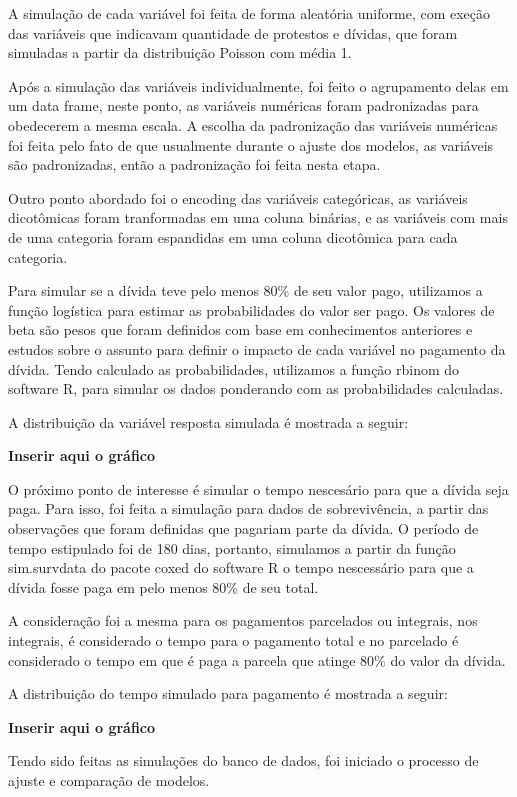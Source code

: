 \documentclass[12pt,a4paper]{article}
\begin{document}
A simulação de cada variável foi feita de forma aleatória uniforme, com exeção das variáveis que indicavam quantidade de protestos e dívidas, que foram simuladas a partir da distribuição Poisson com média 1.

Após a simulação das variáveis individualmente, foi feito o agrupamento delas em um data frame, neste ponto, as variáveis numéricas foram padronizadas para obedecerem a mesma escala. A escolha da padronização das variáveis numéricas foi feita pelo fato de que usualmente durante o ajuste dos modelos, as variáveis são padronizadas, então a padronização foi feita nesta etapa.

Outro ponto abordado foi o encoding das variáveis categóricas, as variáveis dicotômicas foram tranformadas em uma coluna binárias, e as variáveis com mais de uma categoria foram espandidas em uma coluna dicotômica para cada categoria.

Para simular se a dívida teve pelo menos 80\% de seu valor pago, utilizamos a função logística para estimar as probabilidades do valor ser pago. Os valores de beta são pesos que foram definidos com base em conhecimentos anteriores e estudos sobre o assunto para definir o impacto de cada variável no pagamento da dívida. Tendo calculado as probabilidades, utilizamos a função rbinom do software R, para simular os dados ponderando com as probabilidades calculadas.

A distribuição da variável resposta simulada é mostrada a seguir:



 \begin{center}
 \textbf{Inserir aqui o gráfico}
\end{center}


O próximo ponto de interesse é simular o tempo nescesário para que a dívida seja paga. Para isso, foi feita a simulação para dados de sobrevivência, a partir das observações que foram definidas que pagariam parte da dívida. O período de tempo estipulado foi de 180 dias, portanto, simulamos a partir da função sim.survdata do pacote coxed do software R o tempo nescessário para que a dívida fosse paga em pelo menos 80\% de seu total. 

A consideração foi a mesma para os pagamentos parcelados ou integrais, nos integrais, é considerado o tempo para o pagamento total e no parcelado é considerado o tempo em que é paga a parcela que atinge 80\% do valor da dívida.

A distribuição do tempo simulado para pagamento é mostrada a seguir:

\begin{center}
 \textbf{Inserir aqui o gráfico}
\end{center}


Tendo sido feitas as simulações do banco de dados, foi iniciado o processo de ajuste e comparação de modelos.


%
\end{document}
